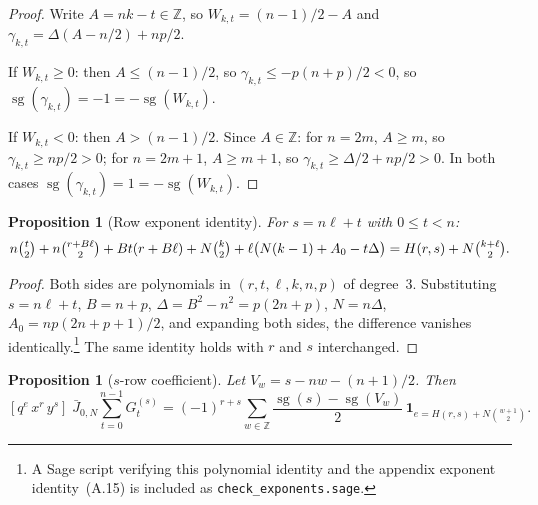 \documentclass[11pt]{article}
\newtheorem{proposition}[theorem]{Proposition}
\newcommand{\Z}{\mathbb{Z}}
\newcommand{\sg}{\operatorname{sg}}
\begin{document}
\begin{proof}
Write $A=nk-t\in\Z$, so $W_{k,t}=(n-1)/2-A$ and
$\gamma_{k,t}=\Delta(A-n/2)+np/2$.

If $W_{k,t}\ge 0$: then $A\le(n-1)/2$, so
$\gamma_{k,t}\le-p(n+p)/2<0$, so $\sg(\gamma_{k,t})=-1=-\sg(W_{k,t})$.

If $W_{k,t}<0$: then $A>(n-1)/2$.  Since $A\in\Z$:
for $n=2m$, $A\ge m$, so $\gamma_{k,t}\ge np/2>0$;
for $n=2m+1$, $A\ge m+1$, so $\gamma_{k,t}\ge\Delta/2+np/2>0$.
In both cases $\sg(\gamma_{k,t})=1=-\sg(W_{k,t})$.
\end{proof}

\begin{proposition}[Row exponent identity]\label{prop:exponent}
For $s=n\ell+t$ with $0\le t<n$:
\[
  n\tbinom{t}{2}+n\tbinom{r+B\ell}{2}+Bt(r+B\ell)
  +N\tbinom{k}{2}+\ell\bigl(N(k-1)+A_0-t\Delta\bigr)
  =H(r,s)+N\tbinom{k+\ell}{2}.
\]
\end{proposition}

\begin{proof}
Both sides are polynomials in $(r,t,\ell,k,n,p)$ of degree~3.
Substituting $s=n\ell+t$, $B=n+p$, $\Delta=B^2-n^2=p(2n+p)$,
$N=n\Delta$, $A_0=np(2n+p+1)/2$, and expanding both sides, the
difference vanishes identically.\footnote{A Sage script
verifying this polynomial identity and the appendix exponent
identity~(A.15) is included as \texttt{check\_exponents.sage}.}
The same identity holds with $r$ and $s$ interchanged.
\end{proof}

\begin{proposition}[$s$-row coefficient]\label{prop:s-row}
Let $V_w=s-nw-(n+1)/2$.  Then
\[
  [q^e\,x^r\,y^s]\;\bar{J}_{0,N}\sum_{t=0}^{n-1}G_t^{(s)}
  =(-1)^{r+s}\sum_{w\in\Z}
    \frac{\sg(s)-\sg(V_w)}{2}\,
    \mathbf{1}_{e=H(r,s)+N\binom{w+1}{2}}.
\]
\end{proposition}
\end{document}
